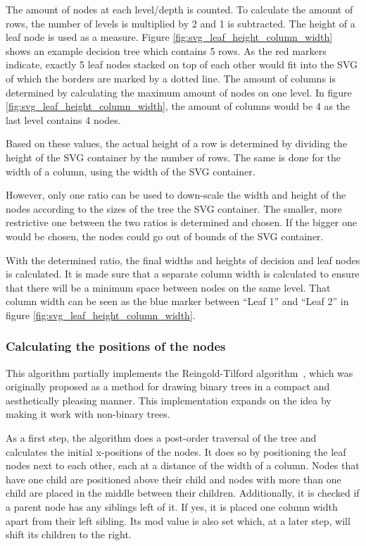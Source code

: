 The amount of nodes at each level/depth is counted. To calculate the amount of rows, the number of levels is multiplied by 2 and 1 is subtracted. The height of a leaf node is used as a measure. Figure \ref{fig:svg_leaf_height_column_width} shows an example decision tree which contains 5 rows.
As the red markers indicate, exactly 5 leaf nodes stacked on top of each other would fit into the SVG of which the borders are marked by a dotted line. The amount of columns is determined by calculating the maximum amount of nodes on one level. In figure \ref{fig:svg_leaf_height_column_width}, the amount of columns would be 4 as the last level contains 4 nodes.

Based on these values, the actual height of a row is determined by dividing the height of the SVG container by the number of rows. The same is done for the width of a column, using the width of the SVG container.

However, only one ratio can be used to down-scale the width and height of the nodes according to the sizes of the tree the SVG container. The smaller, more restrictive one between the two ratios is determined and chosen. If the bigger one would be chosen, the nodes could go out of bounds of the SVG container.

With the determined ratio, the final widths and heights of decision and leaf nodes is calculated. It is made sure that a separate column width is calculated to ensure that there will be a minimum space between nodes on the same level. That column width can be seen as the blue marker between ``Leaf 1'' and ``Leaf 2'' in figure \ref{fig:svg_leaf_height_column_width}.

\subsubsection{Calculating the positions of the nodes}
This algorithm partially implements the Reingold-Tilford algorithm~\cite{reingold-tilford-tidier-drawing-of-trees}, which was originally proposed as a method for drawing binary trees in a compact and aesthetically pleasing manner. This implementation expands on the idea by making it work with non-binary trees.

As a first step, the algorithm does a post-order traversal of the tree and calculates the initial x-positions of the nodes. It does so by positioning the leaf nodes next to each other, each at a distance of the width of a column. Nodes that have one child are positioned above their child and nodes with more than one child are placed in the middle between their children. Additionally, it is checked if a parent node has any siblings left of it. If yes, it is placed one column width apart from their left sibling. Its mod value is also set which, at a later step, will shift its children to the right.

